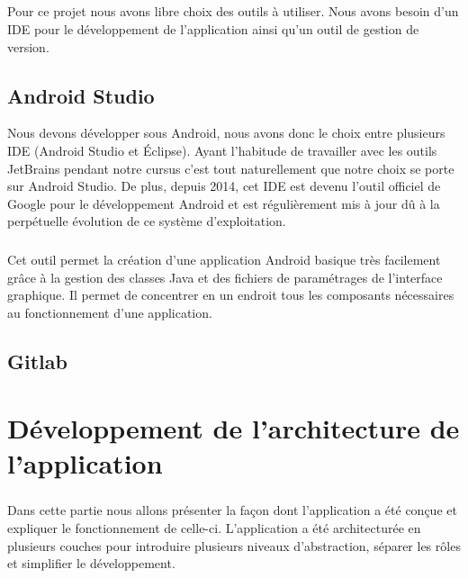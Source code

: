 \documentclass[a4paper,10pt]{report}
\begin{document}
  \paragraph{}
  Pour ce projet nous avons libre choix des outils à utiliser. Nous avons besoin d'un IDE pour le développement de l'application ainsi qu'un outil de gestion de version.

  \section{Android Studio}
  Nous devons développer sous Android, nous avons donc le choix entre plusieurs IDE (Android Studio et Éclipse). Ayant l'habitude de travailler avec les outils JetBrains pendant notre cursus c'est tout naturellement que notre choix se porte sur Android Studio. De plus, depuis 2014, cet IDE est devenu l'outil officiel de Google pour le développement Android et est régulièrement mis à jour dû à la perpétuelle évolution de ce système d'exploitation.
  \paragraph{}
  Cet outil permet la création d'une application Android basique très facilement grâce à la gestion des classes Java et des fichiers de paramétrages de l'interface graphique. Il permet de concentrer en un endroit tous les composants nécessaires au fonctionnement d'une application.
  \section{Gitlab}

\chapter{Développement de l'architecture de l'application}
  \paragraph{}
  Dans cette partie nous allons présenter la façon dont l'application a été conçue et expliquer le fonctionnement de celle-ci. L'application a été architecturée en plusieurs couches pour introduire plusieurs niveaux d'abstraction, séparer les rôles et simplifier le développement.
  
\end{document}
